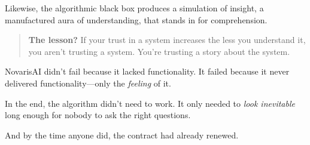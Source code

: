 \begin{tcolorbox}[colback=blue!5!white, colframe=blue!50!black, breakable,
  title={Philosophical Sidebar: The Black Box as Epistemic Mirage}]
\medskip

Likewise, the algorithmic black box produces a simulation of insight, a manufactured aura of understanding, that stands in for comprehension.

\medskip

\begin{quote}
\textbf{The lesson?} If your trust in a system increases the less you understand it, you aren’t trusting a system. You’re trusting a story about the system.
\end{quote}

\end{tcolorbox}

NovarisAI didn’t fail because it lacked functionality. It failed because it never delivered functionality—only the \textit{feeling} of it.

In the end, the algorithm didn’t need to work. It only needed to \textit{look inevitable} long enough for nobody to ask the right questions.

And by the time anyone did, the contract had already renewed.

